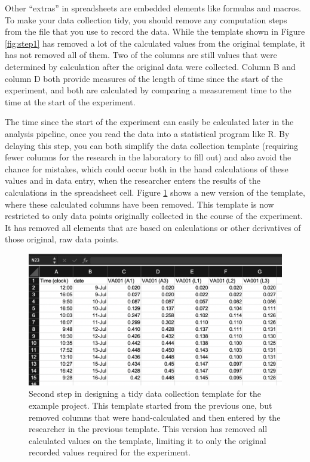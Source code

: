 \documentclass[]{tufte-book}
\begin{document}
Other ``extras'' in spreadsheets are embedded elements like formulas and macros.
To make your data collection tidy, you should remove any computation steps from
the file that you use to record the data. While the template shown in Figure
\ref{fig:step1} has removed a lot of the calculated values from the original
template, it has not removed all of them. Two of the columns are still values
that were determined by calculation after the original data were collected.
Column B and column D both provide measures of the length of time since the
start of the experiment, and both are calculated by comparing a measurement time
to the time at the start of the experiment.

The time since the start of the experiment can easily be calculated later in the
analysis pipeline, once you read the data into a statistical program like R. By
delaying this step, you can both simplify the data collection template
(requiring fewer columns for the research in the laboratory to fill out) and
also avoid the chance for mistakes, which could occur both in the hand
calculations of these values and in data entry, when the researcher enters the
results of the calculations in the spreadsheet cell. Figure \ref{fig:step2}
shows a new version of the template, where these calculated columns have been
removed. This template is now restricted to only data points originally
collected in the course of the experiment. It has removed all elements that are
based on calculations or other derivatives of those original, raw data points.

\begin{figure}
\includegraphics[width=\textwidth]{figures/growth_curve_step2} \caption[Second step in designing a tidy data collection template for the example project]{Second step in designing a tidy data collection template for the example project. This template started from the previous one, but removed columns that were hand-calculated and then entered by the researcher in the previous template. This version has removed all calculated values on the template, limiting it to only the original recorded values required for the experiment.}\label{fig:step2}
\end{figure}
\end{document}

